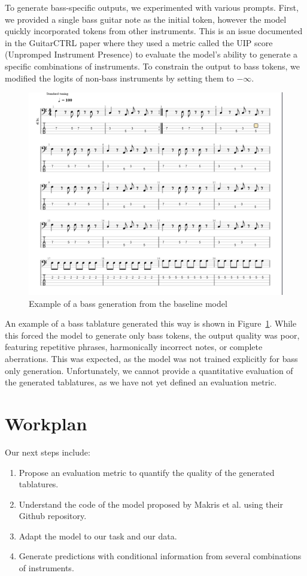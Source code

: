 To generate bass-specific outputs, we experimented with various prompts.
First, we provided a single bass guitar note as the initial token, however the model quickly incorporated tokens from other instruments.
This is an issue documented in the GuitarCTRL paper\cite{sarmento_gtr-ctrl_2023} where they used a metric called the UIP score (Unpromped Instrument Presence) to evaluate the model's ability to generate a specific combinations of instruments.
To constrain the output to bass tokens, we modified the logits of non-bass instruments by setting them to $-\infty$.

\begin{figure}[!ht]
    \centering
    \includegraphics[width=.75\linewidth]{../images-figures/generated_bass_baseline.png}
    \caption{Example of a bass generation from the baseline model}
    \label{fig:repetitive_generation}
\end{figure}

An example of a bass tablature generated this way is shown in Figure~\ref{fig:repetitive_generation}.
While this forced the model to generate only bass tokens, the output quality was poor, featuring repetitive phrases, harmonically incorrect notes, or complete aberrations.
This was expected, as the model was not trained explicitly for bass only generation. 
Unfortunately, we cannot provide a quantitative evaluation of the generated tablatures, as we have not yet defined an evaluation metric.

\section{Workplan}

Our next steps include:
\begin{enumerate}
    \item Propose an evaluation metric to quantify the quality of the generated tablatures.
    \item Understand the code of the model proposed by Makris et al. using their Github repository.
    \item Adapt the model to our task and our data.
    \item Generate predictions with conditional information from several combinations of instruments.
\end{enumerate}